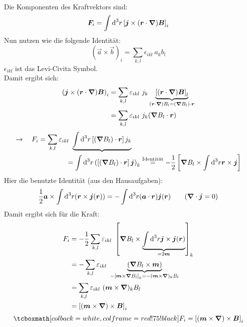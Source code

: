 \\
Die Komponenten des Kraftvektors sind:
\begin{equation*}
\bm{F}_i = \int \textrm{d}^3 r \left[\bm{j} \times (\bm{r} \cdot \bm{\nabla}) \bm{B}\right]_i
\end{equation*}
Nun nutzen wie die folgende Identität:
\begin{equation*}
(\vec{a} \times \vec{b})_i = \sum_{k,l} \epsilon_{ikl} \ a_k b_l
\end{equation*}
$ \epsilon_{ikl} $ ist das Levi-Civita Symbol.\\
Damit ergibt sich:
\begin{align*}
\left(\bm{j} \times (\bm{r} \cdot \bm{\nabla}) \bm{B}\right)_i &= \sum_{k,l} \varepsilon_{ikl} \  j_k \underbrace{\left[(\bm{r} \cdot \bm{\nabla}) \bm{B}\right]_l}_{(\bm{r} \cdot \bm{\nabla}) B_l = (\bm{\nabla} B_l) \cdot \bm{r}}\\
&= \sum_{k,l} \varepsilon_{ikl} \ j_k (\bm{\nabla} B_l \cdot \bm{r})
\end{align*}
\begin{align*}
\rightarrow \quad F_i &= \sum_{k,l} \varepsilon_{ikl} \ \underbrace{\int \textrm{d} ^3 r \left[(\bm{\nabla} B_l) \cdot \bm{r}\right] j_k}\\
&\qquad \qquad = \int \textrm{d}^3 r \left( \left[(\bm{\nabla} B_l) \cdot \bm{r}\right] \bm{j}\right)_k \overset{\textrm{Identität}}{=} - \frac{1}{2} \left[\bm{\nabla} B_l \times \int \textrm{d}^3 r \bm{r} \times \bm{j} \right]
\end{align*}
Hier die benutzte Identität (aus den Hausaufgaben):
\begin{equation*}
\frac{1}{2} \bm{a} \times \int \textrm{d} ^3 r (\bm{r} \times \bm{j} (\bm{r})) = - \int \textrm{d}^3 r (\bm{a} \cdot \bm{r}) \bm{j}(\bm{r}) \qquad (\bm{\nabla} \cdot \bm{j} = 0)
\end{equation*}
Damit ergibt sich für die Kraft:
\begin{align*}
F_i &= - \frac{1}{2} \sum_{k,l} \varepsilon_{ikl} \ \left[\bm{\nabla} B_l \times \underbrace{\int \textrm{d}^3 r \bm{j} \times \bm{j}(\bm{r})}_{=2 \bm{m}}\right]_k \\
&= - \sum_{k,l} \varepsilon_{ikl} \ \underbrace{\left(\bm{\nabla} B_l \times \bm{m}\right)}_{- \left[\bm{m} \times \bm{\nabla} B_l\right]_k = - (\bm{m} \times \bm{\nabla})_k B_l}\\
&= \sum_{k,l} \varepsilon_{ikl} \ (\bm{m} \times \bm{\nabla})_k B_l\\
&= \left[(\bm{m} \times \bm{\nabla}) \times \bm{B}\right]_i
\end{align*}
\begin{equation*}
\rmbox{F_i = \left[(\vec{m} \times \vabla) \times \vec{B}\right]_i}
\end{equation*}

